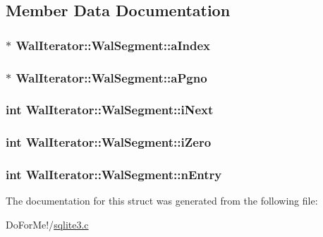 \subsection{Member Data Documentation}
\hypertarget{struct_wal_iterator_1_1_wal_segment_adec397836a127acafcc551cb1fdcd851}{
\subsubsection[{a\-Index}]{$\ast$ Wal\-Iterator\-::\-Wal\-Segment\-::a\-Index}}\label{struct_wal_iterator_1_1_wal_segment_adec397836a127acafcc551cb1fdcd851}
\hypertarget{struct_wal_iterator_1_1_wal_segment_a5e43273a11dc5856934834c0cdf7f198}{
\subsubsection[{a\-Pgno}]{$\ast$ Wal\-Iterator\-::\-Wal\-Segment\-::a\-Pgno}}\label{struct_wal_iterator_1_1_wal_segment_a5e43273a11dc5856934834c0cdf7f198}
\hypertarget{struct_wal_iterator_1_1_wal_segment_a329c939b196f907fe98cf762bb07d291}{
\subsubsection[{i\-Next}]{\setlength{\rightskip}{0pt plus 5cm}int Wal\-Iterator\-::\-Wal\-Segment\-::i\-Next}}\label{struct_wal_iterator_1_1_wal_segment_a329c939b196f907fe98cf762bb07d291}
\hypertarget{struct_wal_iterator_1_1_wal_segment_a3eedec5e8e8dd94be670d50ac144a959}{
\subsubsection[{i\-Zero}]{\setlength{\rightskip}{0pt plus 5cm}int Wal\-Iterator\-::\-Wal\-Segment\-::i\-Zero}}\label{struct_wal_iterator_1_1_wal_segment_a3eedec5e8e8dd94be670d50ac144a959}
\hypertarget{struct_wal_iterator_1_1_wal_segment_ad80cf479aa670eda7aa1adee607af7d9}{
\subsubsection[{n\-Entry}]{\setlength{\rightskip}{0pt plus 5cm}int Wal\-Iterator\-::\-Wal\-Segment\-::n\-Entry}}\label{struct_wal_iterator_1_1_wal_segment_ad80cf479aa670eda7aa1adee607af7d9}


The documentation for this struct was generated from the following file\-:\begin{DoxyCompactItemize}
\item 
Do\-For\-Me!/\hyperlink{sqlite3_8c}{sqlite3.\-c}\end{DoxyCompactItemize}
